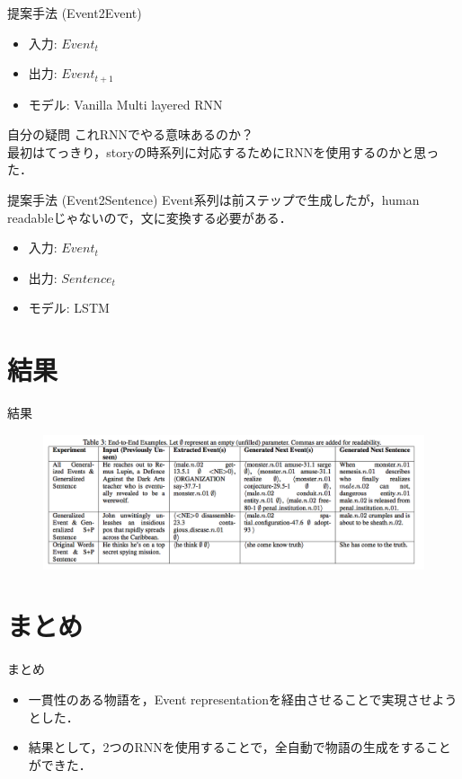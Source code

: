 \documentclass[dvipdfmx, 12pt]{beamer}
\begin{document}
\begin{frame}{提案手法 (Event2Event)}
  \begin{itemize}
    \item 入力: $Event_{t}$
    \item 出力: $Event_{t+1}$
    \item モデル: Vanilla Multi layered RNN
  \end{itemize}

  \begin{alertblock}{自分の疑問}
    これRNNでやる意味あるのか？\\
    最初はてっきり，storyの時系列に対応するためにRNNを使用するのかと思った．
  \end{alertblock}
\end{frame}

\begin{frame}{提案手法 (Event2Sentence)}
  Event系列は前ステップで生成したが，human readableじゃないので，文に変換する必要がある．
  \begin{itemize}
    \item 入力: $Event_{t}$
    \item 出力: $Sentence_{t}$
    \item モデル: LSTM
  \end{itemize}
\end{frame}

\section{結果}
\begin{frame}{結果}
  \begin{figure}
    \includegraphics[width=1.0\textwidth]{imgs/result.png}
  \end{figure}
\end{frame}

\section{まとめ}
\begin{frame}{まとめ}
  \begin{itemize}
    \item 一貫性のある物語を，Event representationを経由させることで実現させようとした．
    \item 結果として，2つのRNNを使用することで，全自動で物語の生成をすることができた．
  \end{itemize}
\end{frame}
\end{document}
